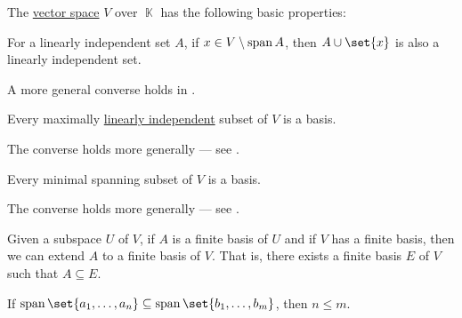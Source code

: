 \begin{proposition}\label{thm:def:vector_space}
  The \hyperref[def:vector_space]{vector space} \( V \) over \( \BbbK \) has the following basic properties:
  \begin{thmenum}
     For a linearly independent set \( A \), if \( x \in V \setminus \operatorname{span} A \), then \( A \cup \set{ x } \) is also a linearly independent set.

    A more general converse holds in .

     Every maximally \hyperref[thm:def:linear_dependence]{linearly independent} subset of \( V \) is a basis.

    The converse holds more generally --- see .

     Every minimal spanning subset of \( V \) is a basis.

    The converse holds more generally --- see .

     Given a subspace \( U \) of \( V \), if \( A \) is a finite basis of \( U \) and if \( V \) has a finite basis, then we can extend \( A \) to a finite basis of \( V \). That is, there exists a finite basis \( E \) of \( V \) such that \( A \subseteq E \).

     If \( \linspan\set{ a_1, \ldots, a_n } \subseteq \linspan\set{ b_1, \ldots, b_m } \), then \( n \leq m \).
  \end{thmenum}
\end{proposition}
